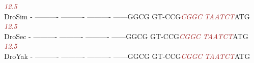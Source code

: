 \documentclass[11pt,twoside,reqno,a4paper]{article}
\begin{document}
{\hspace*{7\charwidth}\hspace*{1\charwidth}\hspace*{1\charwidth}\hspace*{1\charwidth}\hspace*{1\charwidth}\hspace*{1\charwidth}\hspace*{47\charwidth}\textit{\textcolor{Brown}{12.5}}\hspace*{1\charwidth}\\
DroSim	-	----------	----------	----------	------GGCG	GT-CCG\textit{\textcolor{Brown}{C}}\textit{\textcolor{Brown}{G}}\textit{\textcolor{Brown}{G}}\textit{\textcolor{Brown}{C}}	\textit{\textcolor{Brown}{T}}\textit{\textcolor{Brown}{A}}\textit{\textcolor{Brown}{A}}\textit{\textcolor{Brown}{T}}\textit{\textcolor{Brown}{C}}\textit{\textcolor{Brown}{T}}ATG\\
\hspace*{7\charwidth}\hspace*{1\charwidth}\hspace*{1\charwidth}\hspace*{1\charwidth}\hspace*{1\charwidth}\hspace*{1\charwidth}\hspace*{47\charwidth}\textit{\textcolor{Brown}{12.5}}\hspace*{1\charwidth}\\
DroSec	-	----------	----------	----------	------GGCG	GT-CCG\textit{\textcolor{Brown}{C}}\textit{\textcolor{Brown}{G}}\textit{\textcolor{Brown}{G}}\textit{\textcolor{Brown}{C}}	\textit{\textcolor{Brown}{T}}\textit{\textcolor{Brown}{A}}\textit{\textcolor{Brown}{A}}\textit{\textcolor{Brown}{T}}\textit{\textcolor{Brown}{C}}\textit{\textcolor{Brown}{T}}ATG\\
\hspace*{7\charwidth}\hspace*{1\charwidth}\hspace*{1\charwidth}\hspace*{1\charwidth}\hspace*{1\charwidth}\hspace*{1\charwidth}\hspace*{47\charwidth}\textit{\textcolor{Brown}{12.5}}\hspace*{1\charwidth}\\
DroYak	-	----------	----------	----------	------GGCG	GT-CCG\textit{\textcolor{Brown}{C}}\textit{\textcolor{Brown}{G}}\textit{\textcolor{Brown}{G}}\textit{\textcolor{Brown}{C}}	\textit{\textcolor{Brown}{T}}\textit{\textcolor{Brown}{A}}\textit{\textcolor{Brown}{A}}\textit{\textcolor{Brown}{T}}\textit{\textcolor{Brown}{C}}\textit{\textcolor{Brown}{T}}ATG\\
}
\end{document}
